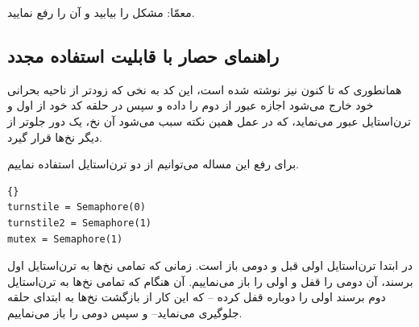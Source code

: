 \documentclass{book}
\newcommand{\clearemptydoublepage}{\newpage\cleardoublepage}
\begin{document}
    معمّا: مشکل را بیابید و آن را رفع نمایید. 


\clearemptydoublepage
\subsection {راهنمای حصار با قابلیت استفاده مجدد}

    همانطوری که تا کنون نیز نوشته شده است، این کد به نخی که زودتر از ناحیه بحرانی خود خارج می‌شود 
    اجازه عبور از  دوم را داده و سپس در حلقه کد خود از  
    اول و ترن‌استایل عبور می‌نماید، که در عمل همین نکته سبب می‌شود آن نخ، یک دور جلوتر از دیگر نخ‌ها قرار گیرد. 

    برای رفع این مساله می‌توانیم از دو ترن‌استایل استفاده نماییم. 

\begin{latin}
\begin{latin}
\begin{lstlisting}[title=\rl{ راهنمای حصار با قابلیت استفاده مجدد}]{} 
turnstile = Semaphore(0)
turnstile2 = Semaphore(1)
mutex = Semaphore(1)
\end{lstlisting}
\end{latin}
\end{latin}

    در ابتدا ترن‌استایل اولی قبل و دومی باز است. زمانی که تمامی نخ‌ها به ترن‌استایل اول برسند، آن دومی را قفل  و اولی را باز می‌نماییم. 
    آن هنگام که تمامی نخ‌ها به ترن‌استایل دوم برسند اولی را دوباره قفل کرده --%
    که این کار از بازگشت نخ‌ها به ابتدای حلقه جلوگیری می‌نماید--
    و سپس دومی را باز می‌نماییم.


\clearemptydoublepage
\end{document}

